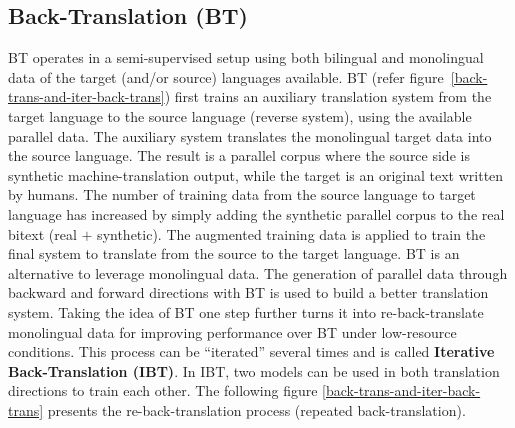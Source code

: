\documentclass[manuscript,screen]{acmart}
\begin{document}
\subsection{Back-Translation (BT)}
BT operates in a semi-supervised setup using both bilingual and monolingual data of the target (and/or source) languages available. BT (refer figure~\ref{back-trans-and-iter-back-trans}) first trains an auxiliary translation system from the target language to the source language (reverse system), using the available parallel data. The auxiliary system translates the monolingual target data into the source language. The result is a parallel corpus where the source side is synthetic machine-translation output, while the target is an original text written by humans. The number of training data from the source language to target language has increased by simply adding the synthetic parallel corpus to the real bitext (real $+$ synthetic). The augmented training data is applied to train the final system to translate from the source to the target language. BT is an alternative to leverage monolingual data. The generation of parallel data through backward and forward directions with BT is used to build a better translation system. Taking the idea of BT one step further turns it into re-back-translate monolingual data for improving performance over BT under low-resource conditions. This process can be ``iterated'' several times and is called \textbf{Iterative Back-Translation (IBT)}. In IBT, two models can be used in both translation directions to train each other. The following figure \ref{back-trans-and-iter-back-trans} presents the re-back-translation process (repeated back-translation). 
\end{document}
